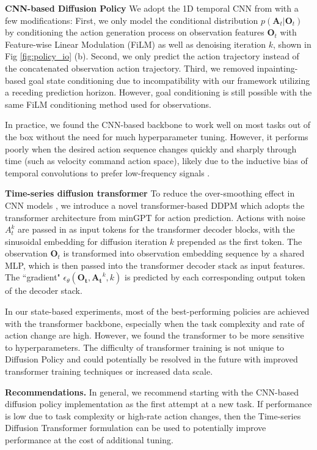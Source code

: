 \textbf{CNN-based Diffusion Policy}
We adopt the 1D temporal CNN from \citet{pmlr-v162-janner22a} with a few modifications:
First, we only model the conditional distribution $p(\mathbf{A}_t|\mathbf{O}_t)$ by conditioning the action generation process on observation features $\mathbf{O}_t$ with Feature-wise Linear Modulation (FiLM) \cite{perez2018film} as well as denoising iteration $k$, shown in Fig \ref{fig:policy_io} (b).
Second, we only predict the action trajectory instead of the concatenated observation action trajectory.
Third, we removed inpainting-based goal state conditioning due to incompatibility with our framework utilizing a receding prediction horizon. However, goal conditioning is still possible with the same FiLM conditioning method used for observations.

In practice, we found the CNN-based backbone to work well on most tasks out of the box without the need for much hyperparameter tuning. However, it performs poorly when the desired action sequence changes quickly and sharply through time (such as velocity command action space), likely due to the inductive bias of temporal convolutions to prefer low-frequency signals \cite{tancik2020fourier}.

\textbf{Time-series diffusion transformer}
To reduce the over-smoothing effect in CNN models \cite{tancik2020fourier}, we introduce a novel transformer-based DDPM which adopts the transformer architecture from minGPT \cite{bet} for action prediction.
Actions with noise $A_t^k$ are passed in as input tokens for the transformer decoder blocks, with the sinusoidal embedding for diffusion iteration $k$ prepended as the first token.
The observation $\mathbf{O}_t$ is transformed into observation embedding sequence by a shared MLP, which is then passed into the transformer decoder stack as input features.
The ``gradient" $\epsilon_\theta(\mathbf{O_t},\mathbf{A_t}^k,k)$ is predicted by each corresponding output token of the decoder stack.

In our state-based experiments, most of the best-performing policies are achieved with the transformer backbone, especially when the task complexity and rate of action change are high. However, we found the transformer to be more sensitive to hyperparameters. The difficulty of transformer training \cite{liu2020understanding} is not unique to Diffusion Policy and could potentially be resolved in the future with improved transformer training techniques or increased data scale.

\textbf{Recommendations.}
 In general, we recommend starting with the CNN-based diffusion policy implementation as the first attempt at a new task. If performance is low due to task complexity or high-rate action changes, then the Time-series Diffusion Transformer formulation can be used to potentially improve performance at the cost of additional tuning.

